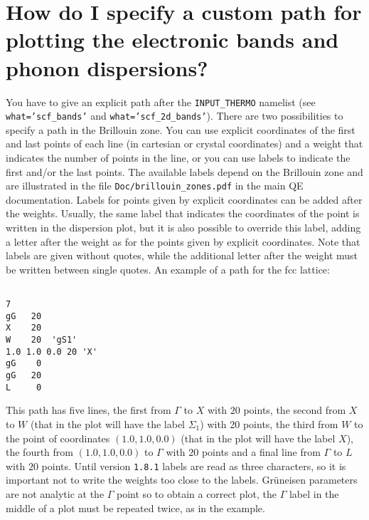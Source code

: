 \documentclass[12pt,a4paper,twoside]{report}
\begin{document}
\newpage
{\color{coral}\section{How do I specify a custom path for 
plotting the electronic bands and phonon dispersions?}}
\color{black}
You have to give an explicit path after the \texttt{INPUT\_THERMO}
namelist (see \texttt{what='scf\_bands'} and \texttt{what='scf\_2d\_bands'}). 
There are two possibilities to specify a path in the Brillouin zone.
You can use explicit coordinates of the first and last points of 
each line (in cartesian or crystal coordinates) and a weight that indicates
the number of points in the line, or you can use labels to 
indicate the first and/or the last points. The available labels depend on
the Brillouin zone and are illustrated in the file
\texttt{Doc/brillouin\_zones.pdf} in the main QE documentation.
Labels for points given by explicit coordinates can be added after 
the weights. 
Usually, the same label that indicates the coordinates of the point
is written in the dispersion plot, but it is also possible
to override this label, adding a letter after the weight as for 
the points given by explicit coordinates. 
Note that labels are given without quotes, while the additional letter
after the weight must be written between single quotes.
An example of a path for the fcc lattice:
\begin{verbatim}

7
gG   20   
X    20
W    20  'gS1'
1.0 1.0 0.0 20 'X'
gG    0
gG   20   
L     0
\end{verbatim}
This path has five lines, the first from $\Gamma$ to $X$ with $20$ points,
the second from $X$ to $W$ (that in the plot will have the label $\Sigma_1$)
with 20 points, the third from $W$ to the point of coordinates 
$(1.0, 1.0, 0.0)$ 
(that in the plot will have the label $X$), the fourth from $(1.0, 1.0, 0.0)$ 
to $\Gamma$ with $20$ points and a final line from $\Gamma$ to $L$ with 
$20$ points.
Until version \texttt{1.8.1} labels are read as three characters, so it 
is important not to write the weights too close to the labels.
Gr\"uneisen parameters are not analytic at the $\Gamma$ 
point so to obtain a correct plot, the $\Gamma$ label in the middle of a 
plot must be repeated twice, as in the example.
\end{document}
